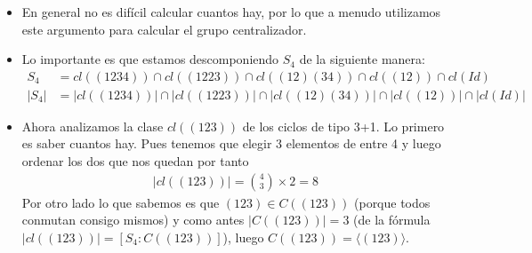 \begin{ej}
\begin{itemize}
		\item En general no es difícil calcular cuantos hay, por lo que a menudo utilizamos este argumento para calcular el grupo centralizador.
		
		\item Lo importante es que estamos descomponiendo $S_4$ de la siguiente manera:
		\begin{align*}
		S_4 &= cl((1234)) \cap cl((1223)) \cap cl((12)(34)) \cap cl((12)) \cap cl(Id) \\
		|S_4| &= |cl((1234))| \cap |cl((1223))| \cap |cl((12)(34))| \cap |cl((12))| \cap |cl(Id)|
		\end{align*}
		\item Ahora analizamos la clase $cl((123))$ de los ciclos de tipo 3+1. Lo primero es saber cuantos hay. Pues tenemos que elegir 3 elementos de entre 4 y luego ordenar los dos que nos quedan por tanto
		\begin{align*}
		|cl((123))| = \binom{4}{3} \times 2 = 8
		\end{align*}
		Por otro lado lo que sabemos es que $(123) \in C((123))$ (porque todos conmutan consigo mismos) y como antes $|C((123))| = 3$ (de la fórmula $|cl((123))| = [S_4:C((123))]$), luego $C((123)) = \langle (123) \rangle$.
		

\end{itemize}
\end{ej}
